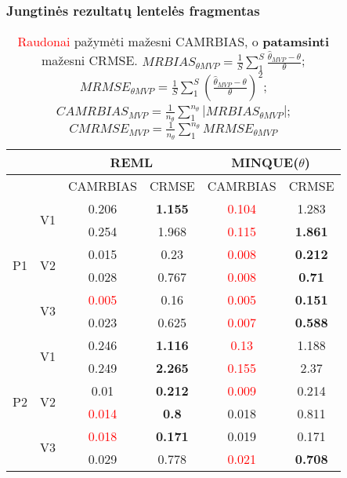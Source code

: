 \documentclass[utf8,hyperref={unicode,pdftex}]{beamer}
\begin{document}
\begin{frame}
\frametitle{Jungtinės rezultatų lentelės fragmentas}
\begin{table}
\centering
{\footnotesize
\begin{tabular}{cc|cc|cc|}
   & & \multicolumn{2}{c|}{REML}&\multicolumn{2}{c|}{MINQUE($\theta$)}\\ \hline
 &  & CAMRBIAS & CRMSE & CAMRBIAS & CRMSE \\ 
  \hline
\multirow{6}{*}{P1} & \multirow{2}{*}{V1} & 0.206 & \textbf{1.155} &  \textcolor{red}{0.104} & 1.283 \\ 
   &  & 0.254 & 1.968 & \textcolor{red}{0.115} & \textbf{1.861} \\ 
   & \multirow{2}{*}{V2} & 0.015 & 0.23 & \textcolor{red}{0.008} & \textbf{0.212} \\ 
   &  & 0.028 & 0.767  & \textcolor{red}{0.008} & \textbf{0.71} \\ 
   & \multirow{2}{*}{V3} & \textcolor{red}{0.005} & 0.16  & \textcolor{red}{0.005} & \textbf{0.151} \\ 
   &  & 0.023 & 0.625 & \textcolor{red}{0.007} & \textbf{0.588} \\ 
   \hline \hline
\multirow{6}{*}{P2} & \multirow{2}{*}{V1} & 0.246 & \textbf{1.116}  & \textcolor{red}{0.13} & 1.188 \\ 
   &  & 0.249 & \textbf{2.265} & \textcolor{red}{0.155} & 2.37 \\ 
   & \multirow{2}{*}{V2} & 0.01 & \textbf{0.212} & \textcolor{red}{0.009} & 0.214 \\ 
   &  & \textcolor{red}{0.014} & \textbf{0.8} & 0.018 & 0.811 \\ 
   & \multirow{2}{*}{V3} & \textcolor{red}{0.018} & \textbf{0.171} & 0.019 & 0.171 \\ 
   &  & 0.029 & 0.778 & \textcolor{red}{0.021} & \textbf{0.708} \\ 
\hline
\end{tabular}
}
\caption{ \textcolor{red}{Raudonai} pažymėti mažesni CAMRBIAS, o \textbf{patamsinti} mažesni CRMSE. $MRBIAS_{\theta MVP}=\frac{1}{S}\sum_1^S\frac{\hat{\theta}_{MVP}-\theta}{\theta}$; $MRMSE_{\theta MVP}=\frac{1}{S}\sum_1^S\left(\frac{\hat{\theta}_{MVP}-\theta}{\theta}\right)^2$; $CAMRBIAS_{MVP}=\frac{1}{n_{\theta}}\sum_1^{n_{\theta}}|MRBIAS_{\theta MVP}|$;$CMRMSE_{MVP}=\frac{1}{n_{\theta}}\sum_1^{n_{\theta}}MRMSE_{\theta MVP}$}
\end{table}


\end{frame}
\end{document}
